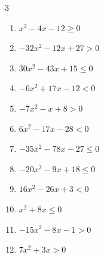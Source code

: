 \begin{multicols}{3}
\begin{enumerate}

  \item $x^{2}-4x-12\geq 0$

        \phantom{$\displaystyle x \leqq -2 , \; 6 \leqq x$}

  \item $-32x^{2}-12x+27>0$


  \item $30x^{2}-43x+15\leq 0$


  \item $-6x^{2}+17x-12<0$


  \item $-7x^{2}-x+8>0$


  \item $6x^{2}-17x-28<0$


  \item $-35x^{2}-78x-27\leq 0$


  \item $-20x^{2}-9x+18\leq 0$


  \item $16x^{2}-26x+3<0$


\columnbreak %

\resetques

  \item $x^{2}+8x\leq 0$

        \phantom{$\displaystyle -8 \leqq x \leqq 0$}

  \item $-15x^{2}-8x-1>0$


  \item $7x^{2}+3x>0$


\end{enumerate}
\end{multicols}
